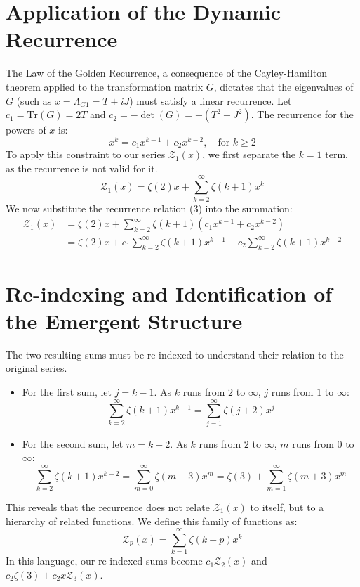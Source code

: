 \documentclass[11pt]{article}
\newcommand{\Z}{\mathcal{Z}}
\newcommand{\T}{\ensuremath{T}}
\newcommand{\J}{\ensuremath{J}}
\newcommand{\LG}{\Lambda_{G1}}
\begin{document}
\section{Application of the Dynamic Recurrence}
The Law of the Golden Recurrence, a consequence of the Cayley-Hamilton theorem applied to the transformation matrix $G$, dictates that the eigenvalues of $G$ (such as $x = \LG = \T+i\J$) must satisfy a linear recurrence. Let $c_1 = \text{Tr}(G) = 2\T$ and $c_2 = -\det(G) = -(\T^2+\J^2)$. The recurrence for the powers of $x$ is:
\begin{equation}
    x^k = c_1 x^{k-1} + c_2 x^{k-2}, \quad \text{for } k \ge 2
\end{equation}
To apply this constraint to our series $\Z_1(x)$, we first separate the $k=1$ term, as the recurrence is not valid for it.
\begin{equation}
    \Z_1(x) = \zeta(2)x + \sum_{k=2}^{\infty} \zeta(k+1)x^k
\end{equation}
We now substitute the recurrence relation (3) into the summation:
\begin{align}
    \Z_1(x) &= \zeta(2)x + \sum_{k=2}^{\infty} \zeta(k+1)\left(c_1 x^{k-1} + c_2 x^{k-2}\right) \\
    &= \zeta(2)x + c_1 \sum_{k=2}^{\infty} \zeta(k+1)x^{k-1} + c_2 \sum_{k=2}^{\infty} \zeta(k+1)x^{k-2}
\end{align}

\section{Re-indexing and Identification of the Emergent Structure}
The two resulting sums must be re-indexed to understand their relation to the original series.
\begin{itemize}
    \item For the first sum, let $j=k-1$. As $k$ runs from $2$ to $\infty$, $j$ runs from $1$ to $\infty$:
    \begin{equation*}
         \sum_{k=2}^{\infty} \zeta(k+1)x^{k-1} = \sum_{j=1}^{\infty} \zeta(j+2)x^{j}
    \end{equation*}
    \item For the second sum, let $m=k-2$. As $k$ runs from $2$ to $\infty$, $m$ runs from $0$ to $\infty$:
    \begin{equation*}
        \sum_{k=2}^{\infty} \zeta(k+1)x^{k-2} = \sum_{m=0}^{\infty} \zeta(m+3)x^{m} = \zeta(3) + \sum_{m=1}^{\infty} \zeta(m+3)x^{m}
    \end{equation*}
\end{itemize}
This reveals that the recurrence does not relate $\Z_1(x)$ to itself, but to a hierarchy of related functions. We define this family of functions as:
\begin{equation}
    \Z_p(x) = \sum_{k=1}^\infty \zeta(k+p)x^k
\end{equation}
In this language, our re-indexed sums become $c_1 \Z_2(x)$ and $c_2\zeta(3) + c_2x\Z_3(x)$.
\end{document}
